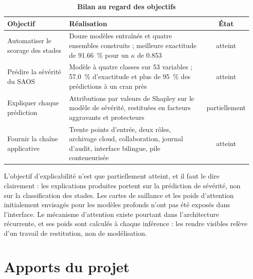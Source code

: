 \begin{table}[H]
\centering
\caption*{\textbf{Bilan au regard des objectifs}}
\small
\begin{tabular}{@{}L{4.2cm}L{7.6cm}c@{}}
\toprule
\textbf{Objectif} & \textbf{Réalisation} & \textbf{État} \\
\midrule
Automatiser le scorage des stades &
Douze modèles entraînés et quatre ensembles construits ; meilleure exactitude de
\SI{91,66}{\percent} pour un $\kappa$ de \num{0,853} &
atteint \\
\addlinespace[3pt]
Prédire la sévérité du SAOS &
Modèle à quatre classes sur 53 variables ; \SI{57,0}{\percent} d'exactitude et plus de
\SI{95}{\percent} des prédictions à un cran près &
atteint \\
\addlinespace[3pt]
Expliquer chaque prédiction &
Attributions par valeurs de Shapley sur le modèle de sévérité, restituées en facteurs
aggravants et protecteurs &
partiellement \\
\addlinespace[3pt]
Fournir la chaîne applicative &
Trente points d'entrée, deux rôles, archivage cloud, collaboration, journal d'audit,
interface bilingue, pile conteneurisée &
atteint \\
\bottomrule
\end{tabular}
\end{table}

L'objectif d'explicabilité n'est que partiellement atteint, et il faut le dire
clairement : les explications produites portent sur la prédiction de sévérité, non sur
la classification des stades. Les cartes de saillance et les poids d'attention
initialement envisagés pour les modèles profonds n'ont pas été exposés dans
l'interface. Le mécanisme d'attention existe pourtant dans l'architecture récurrente,
et ses poids sont calculés à chaque inférence : les rendre visibles relève d'un travail
de restitution, non de modélisation.

\section*{Apports du projet}

